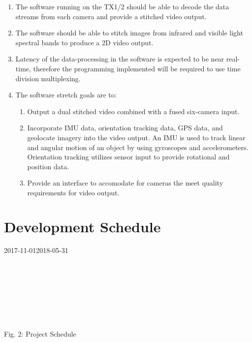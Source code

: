 \documentclass[letterpaper,10pt,serif,draftclsnofoot,onecolumn,compsoc,titlepage]{IEEEtran}
\begin{document}
\begin{enumerate}[label=\alph*]
	\item The software running on the TX1/2 should be able to decode the data streams 
	from each camera and provide a stitched video output.\\
	\item The software should be able to stitch images from infrared 
	and visible light spectral bands to produce a 2D video output. \\
	\item Latency of the data-processing in the software is expected to be near 
	real-time, therefore the programming implemented will be required to use time
	division multiplexing. \\
	\item The software stretch goals are to:
	\begin{enumerate}
	 	\item Output a dual stitched video combined with a fused six-camera input.\\
		\item Incorporate IMU data, orientation tracking data, GPS data, and geolocate 
		imagery into the video output. An IMU is used to track linear and angular 
		motion of an object by using gyroscopes and accelerometers. Orientation 
		tracking utilizes sensor input to provide rotational and position data.\\
		\item Provide an interface to accomodate for cameras the meet quality
		requirements for video output. \\
	\end{enumerate} 
\end{enumerate}

\section{Development Schedule}
	\begin{ganttchart}
    	[hgrid, x unit=0.77mm, y unit chart=9.0mm, title label font=\normalsize, time slot format=isodate]
    	{2017-11-01}{2018-05-31}
    	\\
    	\\
    	\\
    	\\
    	\\
    	\\
    	\\
    	\\
	\end{ganttchart}
\begin{center}
	Fig. 2: Project Schedule
\end{center}	
\end{document}
